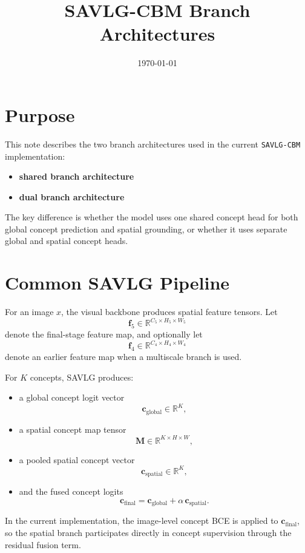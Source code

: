 \documentclass[11pt]{article}
\title{SAVLG-CBM Branch Architectures}
\author{}
\date{\today}
\begin{document}
\maketitle

\section{Purpose}
This note describes the two branch architectures used in the current
\texttt{SAVLG-CBM} implementation:
\begin{itemize}
    \item \textbf{shared branch architecture}
    \item \textbf{dual branch architecture}
\end{itemize}
The key difference is whether the model uses one shared concept head for both
global concept prediction and spatial grounding, or whether it uses separate
global and spatial concept heads.

\section{Common SAVLG Pipeline}
For an image $x$, the visual backbone produces spatial feature tensors. Let
\[
\mathbf{f}_5 \in \mathbb{R}^{C_5 \times H_5 \times W_5}
\]
denote the final-stage feature map, and optionally let
\[
\mathbf{f}_4 \in \mathbb{R}^{C_4 \times H_4 \times W_4}
\]
denote an earlier feature map when a multiscale branch is used.

For $K$ concepts, SAVLG produces:
\begin{itemize}
    \item a global concept logit vector
    \[
    \mathbf{c}_{\mathrm{global}} \in \mathbb{R}^{K},
    \]
    \item a spatial concept map tensor
    \[
    \mathbf{M} \in \mathbb{R}^{K \times H \times W},
    \]
    \item a pooled spatial concept vector
    \[
    \mathbf{c}_{\mathrm{spatial}} \in \mathbb{R}^{K},
    \]
    \item and the fused concept logits
    \[
    \mathbf{c}_{\mathrm{final}}
    =
    \mathbf{c}_{\mathrm{global}}
    +
    \alpha \, \mathbf{c}_{\mathrm{spatial}}.
    \]
\end{itemize}

In the current implementation, the image-level concept BCE is applied to
$\mathbf{c}_{\mathrm{final}}$, so the spatial branch participates directly in
concept supervision through the residual fusion term.
\end{document}
